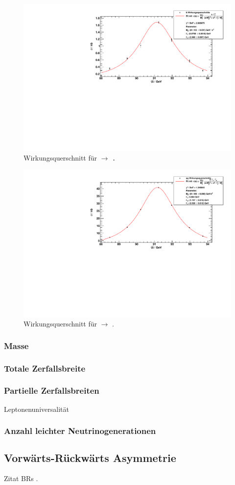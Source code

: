 \begin{figure}[H]
\begin{center}
  \includegraphics[width=\textwidth]{../img/crosssections_tt.pdf}
  \caption{Wirkungsquerschnitt für \ee $\to$ \tt.}
  \label{img:crosssection:tt}
\end{center}
\end{figure}

\begin{figure}[H]
\begin{center}
  \includegraphics[width=\textwidth]{../img/crosssections_qq.pdf}
  \caption{Wirkungsquerschnitt für \ee $\to$ \qq.}
  \label{img:crosssection:qq}
\end{center}
\end{figure}

\subsubsection{Masse}
\subsubsection{Totale Zerfallsbreite}
\subsubsection{Partielle Zerfallsbreiten}
Leptonenuniversalität
\subsubsection{Anzahl leichter Neutrinogenerationen}
\subsection{Vorwärts-Rückwärts Asymmetrie}

Zitat BRs \cite{pdg}.